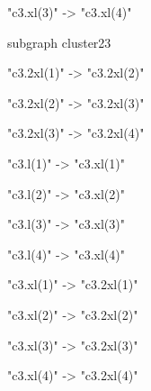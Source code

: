 {{{    "c3.xl(3)" -> "c3.xl(4)"

  }

subgraph cluster23 {
    "c3.2xl(1)" -> "c3.2xl(2)"

    "c3.2xl(2)" -> "c3.2xl(3)"

    "c3.2xl(3)" -> "c3.2xl(4)"
  }  

  
  "c3.l(1)" -> "c3.xl(1)"
   
  "c3.l(2)" -> "c3.xl(2)"
  
  "c3.l(3)" -> "c3.xl(3)"
  
  "c3.l(4)" -> "c3.xl(4)" 
  
  "c3.xl(1)" -> "c3.2xl(1)" 
  
  "c3.xl(2)" -> "c3.2xl(2)"
  
  "c3.xl(3)" -> "c3.2xl(3)"
  
  "c3.xl(4)" -> "c3.2xl(4)"
}

}